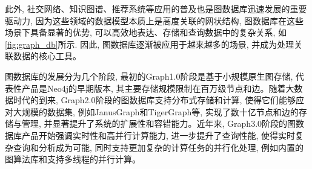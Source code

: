 此外, 社交网络、知识图谱、推荐系统等应用的普及也是图数据库迅速发展的重要驱动力, 因为这些领域的数据模型本质上是高度关联的网状结构, 图数据库在这些场景下具备显著的优势, 可以高效地表达、存储和查询数据中的复杂关系, 如\cref{fig:graph_db}所示. 因此, 图数据库逐渐被应用于越来越多的场景, 并成为处理关联数据的核心工具。

图数据库的发展分为几个阶段, 最初的Graph1.0阶段是基于小规模原生图存储, 代表性产品是Neo4j的早期版本, 其主要存储规模限制在百万级节点和边。随着大数据时代的到来, Graph2.0阶段的图数据库支持分布式存储和计算, 使得它们能够应对大规模的数据集, 例如JanusGraph和TigerGraph等, 实现了数十亿节点和边的存储与管理, 并显著提升了系统的扩展性和容错能力。近年来, Graph3.0阶段的图数据库产品开始强调实时性和高并行计算能力, 进一步提升了查询性能, 使得实时复杂查询和分析成为可能, 同时支持更加复杂的计算任务的并行化处理, 例如内置的图算法库和支持多线程的并行计算。

